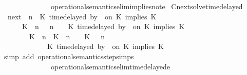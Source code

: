\begin{isabellebody}
\ \ \ \ \ \ \ \ \ \ \ \ \ \ operational{\isacharunderscore}semantics{\isacharunderscore}elim{\isachardot}implies{\isacharunderscore}not{\isacharunderscore}e{}{\isacharparenright}%
\endisatagproof
{\isafoldproof}%
%
\isadelimproof
\isanewline
%
\endisadelimproof
\isanewline
{}\isamarkupfalse%
\ Cnext{\isacharunderscore}solve{\isacharunderscore}timedelayed{\isacharcolon}\isanewline
\ \ {\isacartoucheopen}{\isacharparenleft}{\isasymC}\isactrlsub n\isactrlsub e\isactrlsub x\isactrlsub t\ {\isacharparenleft}{\isasymGamma}{\isacharcomma}\ n\ {\isasymturnstile}\ {\isacharparenleft}{\isacharparenleft}K\ time{\isacharminus}delayed\ by\ {\isasymdelta}{\isasymtau}\ on\ K\ implies\ K\ {\isacharhash}\ {\isasymPsi}{\isacharparenright}\ {\isasymtriangleright}\ {\isasymPhi}{\isacharparenright}{\isacharparenright}\isanewline
\ \ \ \ {\isasymsupseteq}\ {\isacharbraceleft}\ {\isacharparenleft}{\isacharparenleft}K\ {\isasymnot}{\isasymUp}\ n{\isacharparenright}\ {\isacharhash}\ {\isasymGamma}{\isacharparenright}{\isacharcomma}\ n\ {\isasymturnstile}\ {\isasymPsi}\ {\isasymtriangleright}\ {\isacharparenleft}{\isacharparenleft}K\ time{\isacharminus}delayed\ by\ {\isasymdelta}{\isasymtau}\ on\ K\ implies\ K\ {\isacharhash}\ {\isasymPhi}{\isacharparenright}{\isacharcomma}\isanewline
\ \ \ \ \ \ \ \ {\isacharparenleft}{\isacharparenleft}K\ {\isasymUp}\ n{\isacharparenright}\ {\isacharhash}\ {\isacharparenleft}K\ {\isacharat}\ n\ {\isasymoplus}\ {\isasymdelta}{\isasymtau}\ {\isasymRightarrow}\ K\ {\isacharhash}\ {\isasymGamma}{\isacharparenright}{\isacharcomma}\ n\isanewline
\ \ \ \ \ \ \ \ \ \ {\isasymturnstile}\ {\isasymPsi}\ {\isasymtriangleright}\ {\isacharparenleft}{\isacharparenleft}K\ time{\isacharminus}delayed\ by\ {\isasymdelta}{\isasymtau}\ on\ K\ implies\ K\ {\isacharhash}\ {\isasymPhi}{\isacharparenright}\ {\isacharbraceright}{\isacartoucheclose}\isanewline
%
\isadelimproof
%
\endisadelimproof
%
\isatagproof
{}\isamarkupfalse%
\ {\isacharparenleft}simp\ add{\isacharcolon}\ operational{\isacharunderscore}semantics{\isacharunderscore}step{\isachardot}simps\isanewline
\ \ \ \ \ \ \ \ \ \ \ \ \ \ operational{\isacharunderscore}semantics{\isacharunderscore}elim{\isachardot}timedelayed{\isacharunderscore}e{}\isanewline

\end{isabellebody}
